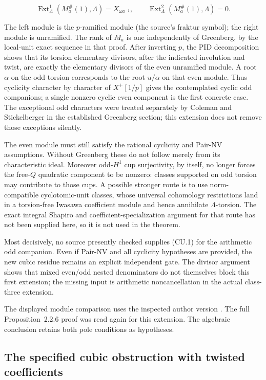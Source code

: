 \documentclass[11pt,a4paper]{article}
\theoremstyle{definition}
\begin{document}
\[
\operatorname{Ext}^1_\Lambda(M_a^\#(1),\Lambda)
   =X_{\omega a^{-1}},
\qquad
\operatorname{Ext}^2_\Lambda(M_a^\#(1),\Lambda)=0.
\]

The left module is the \(p\)-ramified module (the source's fraktur symbol); the right module is unramified. The rank of \(M_a\) is one independently of Greenberg, by the local-unit exact sequence in that proof. After inverting \(p\), the PID decomposition shows that its torsion elementary divisors, after the indicated involution and twist, are exactly the elementary divisors of the even unramified module. A root \(\alpha\) on the odd torsion corresponds to the root \(u/\alpha\) on that even module. Thus cyclicity character by character of \(X^+[1/p]\) gives the contemplated cyclic odd companions; a single nonzero cyclic even component is the first concrete case. The exceptional odd characters were treated separately by Coleman and Stickelberger in the established Greenberg section; this extension does not remove those exceptions silently.

The even module must still satisfy the rational cyclicity and Pair-NV assumptions. Without Greenberg these do not follow merely from its characteristic ideal. Moreover odd-\(H^1\) cup surjectivity, by itself, no longer forces the free-\(Q\) quadratic component to be nonzero: classes supported on odd torsion may contribute to those cups. A possible stronger route is to use norm-compatible cyclotomic-unit classes, whose universal cohomology restrictions land in a torsion-free Iwasawa coefficient module and hence annihilate \(\Lambda\)-torsion. The exact integral Shapiro and coefficient-specialization argument for that route has not been supplied here, so it is not used in the theorem.

Most decisively, no source presently checked supplies (CU.1) for the arithmetic odd companion. Even if Pair-NV and all cyclicity hypotheses are provided, the new cubic residue remains an explicit independent gate. The divisor argument shows that mixed even/odd nested denominators do not themselves block this first extension; the missing input is arithmetic noncancellation in the actual class-three extension.

The displayed module comparison uses the inspected author version \cite{WakeWangErickson2017}. The full Proposition~2.2.6 proof was read again for this extension. The algebraic conclusion retains both pole conditions as hypotheses.

\subsection{The specified cubic obstruction with twisted coefficients}
\label{sec:cubic-twisted-obstruction}
\end{document}
